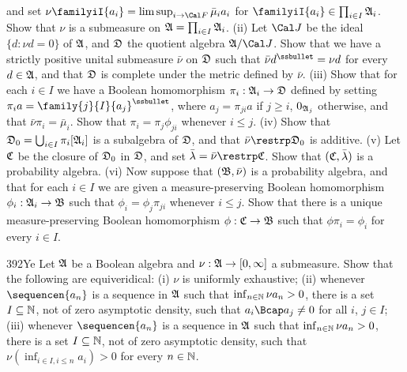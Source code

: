 {\noindent and set
$\nu\familyiI{a_i}=\limsup_{i\to\Cal F}\bar\mu_ia_i$ for
$\familyiI{a_i}\in\prod_{i\in I}\frak A_i$.   Show that $\nu$ is a
submeasure on $\frak A=\prod_{i\in I}\frak A_i$.   (ii) Let $\Cal J$ be the
ideal $\{d:\nu d=0\}$ of $\frak A$, and $\frak D$ the quotient algebra
$\frak A/\Cal J$.   Show that we have a strictly positive
unital submeasure
$\bar\nu$ on $\frak D$ such that $\bar\nu d^{\ssbullet}=\nu d$ for every
$d\in\frak A$, and that $\frak D$ is complete under the metric defined by
$\bar\nu$.   (iii) Show that for each $i\in I$ we have a Boolean
homomorphism $\pi_i:\frak A_i\to\frak D$ defined by setting
$\pi_ia=\family{j}{I}{a_j}^{\ssbullet}$, where $a_j=\pi_{ji}a$ if
$j\ge i$, $0_{\frak A_j}$ otherwise, and that $\bar\nu\pi_i=\bar\mu_i$.
Show that $\pi_i=\pi_j\phi_{ji}$ whenever $i\le j$.
(iv) Show that
$\frak D_0=\bigcup_{i\in I}\pi_i[\frak A_i]$ is a subalgebra of $\frak D$,
and that $\bar\nu\restrp\frak D_0$ is additive.   (v) Let $\frak C$ be the
closure of $\frak D_0$ in $\frak D$, and set
$\bar\lambda=\bar\nu\restrp\frak C$.   Show that $(\frak C,\bar\lambda)$ is
a probability algebra.
(vi) Now suppose that $(\frak B,\bar\nu)$ is a probability algebra, and
that for each $i\in I$ we are given a measure-preserving
Boolean homomorphism $\phi_i:\frak A_i\to\frak B$ such that
$\phi_i=\phi_j\pi_{ji}$ whenever $i\le j$.   Show that
there is a unique measure-preserving Boolean homomorphism
$\phi:\frak C\to\frak B$ such that $\phi\pi_i=\phi_i$ for every $i\in I$.

\spheader 392Ye Let $\frak A$ be a Boolean algebra and
$\nu:\frak A\to[0,\infty]$ a submeasure.   Show that
the following are equiveridical:   (i) $\nu$ is uniformly exhaustive;
(ii) whenever
$\sequencen{a_n}$ is a sequence in $\frak A$ such that
$\inf_{n\in\Bbb N}\nu a_n>0$, there is a set
$I\subseteq\Bbb N$, not of zero asymptotic density, such that
$a_i\Bcap a_j\ne 0$ for all $i$, $j\in I$;  (iii)
whenever $\sequencen{a_n}$ is a sequence in $\frak A$ such that
$\inf_{n\in\Bbb N}\nu a_n>0$, there is a set
$I\subseteq\Bbb N$, not of zero asymptotic density, such that
$\nu(\inf_{i\in I,i\le n}a_i)>0$ for every $n\in\Bbb N$.
}%

